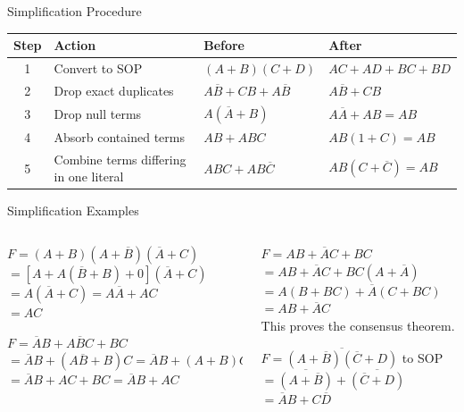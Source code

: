 \documentclass[9pt,aspectratio=169,xcolor=table]{beamer}
\newcommand{\striped}{\rowcolors{1}{white}{stripe}}
\begin{document}
\begin{frame}{Simplification Procedure}
  \centering\small\striped
  \begin{tabular}{@{}cR{.2\textwidth}ll@{}}
    \toprule
    \textbf{Step} & \textbf{Action} & \textbf{Before} & \textbf{After} \\
     & Convert to SOP & $(A+B)(C+D)$ & $AC+AD+BC+BD$ \\
    2 & Drop exact duplicates & $A\overline{B}+CB+A\overline{B}$ & $A\overline{B}+CB$ \\
    3 & Drop null terms & $A(\overline{A}+B)$ & $A\overline{A}+AB = AB$ \\
    4 & Absorb contained terms & $AB+ABC$ & $AB(1+C) = AB$ \\
    5 & Combine terms differing in one literal & $ABC+AB\overline{C}$ & $AB(C+\overline{C}) = AB$ \\
    \bottomrule
  \end{tabular}
\end{frame}

\begin{frame}{Simplification Examples}
  \begin{columns}[t]
  \begin{column}{.5\textwidth}
    \begin{block}{$F = (A+B)(A+\overline{B})(\overline{A}+C)$}
      \scriptsize
      $= [A + A(\overline{B}+B) + 0](\overline{A}+C)$\\
      $= A(\overline{A}+C) = A\overline{A} + AC$\\
      $= AC$
    \end{block}
    \begin{block}{$F = \overline{A}B + A\overline{B}C + BC$}
      \scriptsize
      $= \overline{A}B + (A\overline{B}+B)C = \overline{A}B + (A+B)C$\\
      $= \overline{A}B + AC + BC = \overline{A}B + AC$
    \end{block}
  \end{column}
  \begin{column}{.48\textwidth}
    \begin{block}{$F = AB + \overline{A}C + BC$}
      \scriptsize
      $= AB + \overline{A}C + BC(A+\overline{A})$\\
      $= A(B+BC) + \overline{A}(C+BC)$\\
      $= AB + \overline{A}C$\\
      This proves the consensus theorem.
    \end{block}
    \begin{block}{$F = \overline{(A+\overline{B})(\overline{C}+D)}$ to SOP}
      \scriptsize
      $= \overline{(A+\overline{B})} + \overline{(\overline{C}+D)}$\\
      $= \overline{A}B + C\overline{D}$
    \end{block}
  \end{column}
  \end{columns}
\end{frame}
\end{document}
